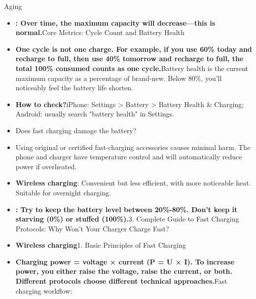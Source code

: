 


Aging

\begin{itemize}
  \item \textbf{: Over time, the maximum capacity will decrease—this is normal.}Core Metrics: Cycle Count and Battery Health
  \item \textbf{One cycle is not one charge. For example, if you use 60\% today and recharge to full, then use 40\% tomorrow and recharge to full, the total 100\% consumed counts as one cycle.}Battery health is the current maximum capacity as a percentage of brand-new. Below 80\%, you'll noticeably feel the battery life shorten.
  \item \textbf{How to check?}iPhone: Settings > Battery > Battery Health \& Charging; Android: usually search "battery health" in Settings.
\end{itemize}


\begin{itemize}
  \item Does fast charging damage the battery?
  \item Using original or certified fast-charging accessories causes minimal harm. The phone and charger have temperature control and will automatically reduce power if overheated.
  \item \textbf{Wireless charging}: Convenient but less efficient, with more noticeable heat. Suitable for overnight charging.
\end{itemize}


\begin{itemize}
  \item \textbf{: Try to keep the battery level between 20\%-80\%. Don't keep it starving (0\%) or stuffed (100\%).}3. Complete Guide to Fast Charging Protocols: Why Won't Your Charger Charge Fast?
  \item \textbf{Wireless charging}1. Basic Principles of Fast Charging
  \item \textbf{Charging power = voltage × current (P = U × I). To increase power, you either raise the voltage, raise the current, or both. Different protocols choose different technical approaches.}Fast charging workflow:
\end{itemize}

